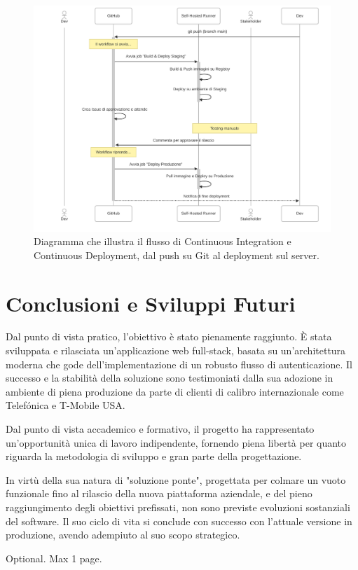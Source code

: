 \documentclass[12pt,a4paper,openright,twoside]{book}
\begin{document}
\begin{figure}[H]
    \centering
    \includegraphics[width=\textwidth]{figures/pipeline_sequence.pdf}
    \caption{Diagramma che illustra il flusso di Continuous Integration e Continuous Deployment, dal push su Git al deployment sul server.}
    \label{fig:ci_cd_diagram}
\end{figure}



\chapter{Conclusioni e Sviluppi Futuri}
\label{chap:conclusioni}

Dal punto di vista pratico, l'obiettivo è stato pienamente raggiunto. È stata sviluppata e rilasciata un'applicazione web full-stack, basata su un'architettura moderna che gode dell'implementazione di un robusto flusso di autenticazione. Il successo e la stabilità della soluzione sono testimoniati dalla sua adozione in ambiente di piena produzione da parte di clienti di calibro internazionale come Telefónica e T-Mobile USA.

Dal punto di vista accademico e formativo, il progetto ha rappresentato un'opportunità unica di lavoro indipendente, fornendo piena libertà per quanto riguarda la metodologia di sviluppo e gran parte della progettazione.

In virtù della sua natura di "soluzione ponte", progettata per colmare un vuoto funzionale fino al rilascio della nuova piattaforma aziendale, e del pieno raggiungimento degli obiettivi prefissati, non sono previste evoluzioni sostanziali del software. Il suo ciclo di vita si conclude con successo con l'attuale versione in produzione, avendo adempiuto al suo scopo strategico.


\backmatter





\begin{acknowledgements}
    Optional. Max 1 page.
\end{acknowledgements}
\end{document}
